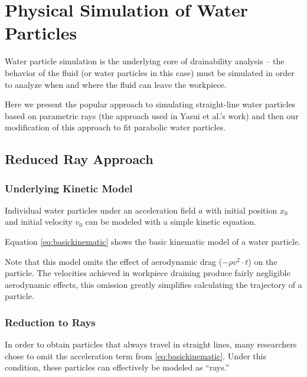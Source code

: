 						\chapter{Physical Simulation of Water Particles}

Water particle simulation is the underlying core of drainability analysis -- the behavior of the fluid (or water particles in this case) must be simulated in order to analyze when and where the fluid can leave the workpiece.

Here we present the popular approach to simulating straight-line water particles based on parametric rays (the approach used in Yasui et al.'s work) and then our modification of this approach to fit parabolic water particles.

\section{Reduced Ray Approach}

	\subsection{Underlying Kinetic Model}

Individual water particles under an acceleration field $a$ with initial position $x_0$ and initial velocity $v_0$ can be modeled with a simple kinetic equation.


Equation \eqref{eq:basickinematic} shows the basic kinematic model of a water particle.


Note that this model omits the effect of aerodynamic drag ($-\rho v^2 \cdot t$) on the particle. The velocities achieved in workpiece draining produce fairly negligible aerodynamic effects, this omission greatly simplifies calculating the trajectory of a particle.

	\subsection{Reduction to Rays}

In order to obtain particles that always travel in straight lines, many researchers chose to omit the acceleration term from \eqref{eq:basickinematic}. Under this condition, these particles can effectively be modeled as ``rays.''


